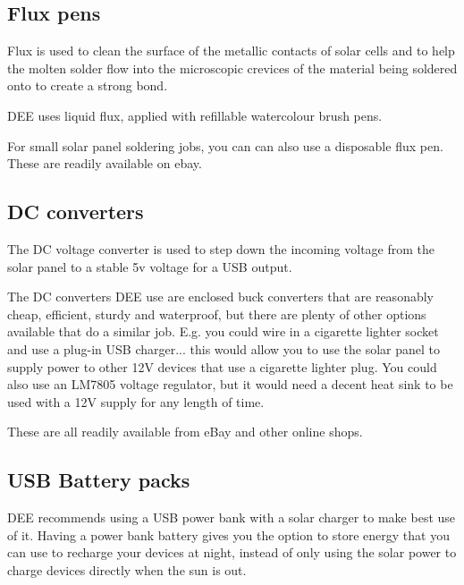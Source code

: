 \documentclass{article}
\theoremstyle{definition}
\theoremstyle{definition}
\theoremstyle{remark}
\begin{document}

  \subsection{Flux pens} %
  \label{sub:flux_pens}

    Flux is used to clean the surface of the metallic contacts of solar cells and to help the molten solder flow into the microscopic crevices of the material being soldered onto to create a strong bond.

    DEE uses liquid flux, applied with refillable watercolour brush pens. 

    For small solar panel soldering jobs, you can can also use a disposable flux pen. These are readily available on ebay.


  \subsection{DC converters} %
  \label{sub:dc_converters}

    The DC voltage converter is used to step down the incoming voltage from the solar panel to a stable 5v voltage for a USB output. 

    The DC converters DEE use are enclosed buck converters that are reasonably cheap, efficient, sturdy and waterproof, but there are plenty of other options available that do a similar job. E.g. you could wire in a cigarette lighter socket and use a plug-in USB charger... this would allow you to use the solar panel to supply power to other 12V devices that use a cigarette lighter plug. You could also use an LM7805 voltage regulator, but it would need a decent heat sink to be used with a 12V supply for any length of time.

    These are all readily available from eBay and other online shops. 
  

  \subsection{USB Battery packs} %
  \label{sub:usb_battery_packs}

    DEE recommends using a USB power bank with a solar charger to make best use of it. Having a power bank battery gives you the option to store energy that you can use to recharge your devices at night, instead of only using the solar power to charge devices directly when the sun is out.
\end{document}
